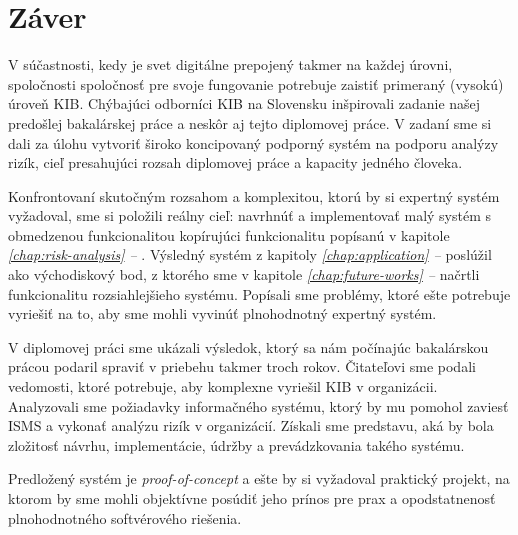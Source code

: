 \chapter*{Záver}

V súčastnosti, kedy je svet digitálne prepojený takmer na každej úrovni, spoločnosti spoločnosť pre svoje fungovanie potrebuje zaistiť primeraný (vysokú)
úroveň KIB. Chýbajúci odborníci KIB na Slovensku inšpirovali zadanie našej predošlej bakalárskej práce a neskôr aj tejto diplomovej práce. V zadaní sme
si dali za úlohu vytvoriť široko koncipovaný podporný systém na podporu analýzy rizík, cieľ presahujúci rozsah diplomovej práce a kapacity jedného človeka.

Konfrontovaní skutočným rozsahom a komplexitou, ktorú by si expertný systém vyžadoval, sme si položili reálny cieľ: navrhnúť a implementovať
malý systém s obmedzenou funkcionalitou kopírujúci funkcionalitu popísanú v kapitole \emph{\ref{chap:risk-analysis} -- }.
Výsledný systém z kapitoly \emph{\ref{chap:application} -- } poslúžil ako východiskový bod, z ktorého sme v kapitole
\emph{\ref{chap:future-works} -- } načrtli funkcionalitu rozsiahlejšieho systému. Popísali sme problémy, ktoré ešte potrebuje
vyriešiť na to, aby sme mohli vyvinúť plnohodnotný expertný systém.

V diplomovej práci sme ukázali výsledok, ktorý sa nám počínajúc bakalárskou prácou podaril spraviť v priebehu takmer troch rokov. Čitateľovi
sme podali vedomosti, ktoré potrebuje, aby komplexne vyriešil KIB v organizácii. Analyzovali sme požiadavky informačného systému, ktorý by mu
pomohol zaviesť ISMS a vykonať analýzu rizík v organizácií. Získali sme predstavu, aká by bola zložitosť návrhu, implementácie, údržby a
prevádzkovania takého systému.

Predložený systém je \emph{proof-of-concept} a ešte by si vyžadoval praktický projekt, na ktorom by sme mohli objektívne posúdiť jeho prínos pre
prax a opodstatnenosť plnohodnotného softvérového riešenia.
